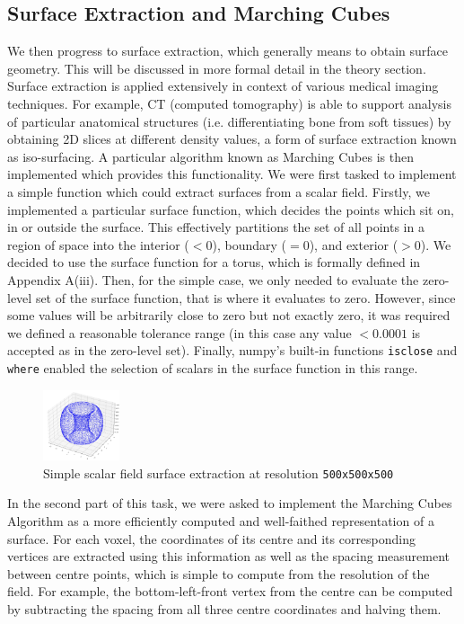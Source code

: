 \documentclass[10pt,a4paper]{article}
\begin{document}
\subsection{Surface Extraction and Marching Cubes}

We then progress to surface extraction, which generally means to obtain surface geometry. This will be discussed in more formal detail in the theory section. Surface extraction is applied extensively in context of various medical imaging techniques. For example, CT (computed tomography) is able to support analysis of particular anatomical structures (i.e. differentiating bone from soft tissues) by obtaining 2D slices at different density values, a form of surface extraction known as iso-surfacing.  A particular algorithm known as Marching Cubes is then implemented which provides this functionality.  We were first tasked to implement a simple function which could extract surfaces from a scalar field. Firstly, we implemented a particular surface function, which decides the points which sit on, in or outside the surface. This effectively partitions the set of all points in a region of space into the interior ($<0$), boundary ($=0$), and exterior ($>0$). We decided to use the surface function for a torus, which is formally defined in Appendix A(iii). Then, for the simple case, we only needed to evaluate the zero-level set of the surface function, that is where it evaluates to zero. However, since some values will be arbitrarily close to zero but not exactly zero, it was required we defined a reasonable tolerance range (in this case any value $<0.0001$ is accepted as in the zero-level set). Finally, numpy’s built-in functions \texttt{isclose} and \texttt{where} enabled the selection of scalars in the surface function in this range.

\begin{figure}[H]
\centering
\includegraphics[width=0.20\textwidth]{VisualComputingReportResults/SimpleSurfaceExtraction}
\caption{Simple scalar field surface extraction at resolution \texttt{500x500x500}}
\label{fig:your_label}
\end{figure}

In the second part of this task, we were asked to implement the Marching Cubes Algorithm as a more efficiently computed and well-faithed representation of a surface. For each voxel, the coordinates of its centre and its corresponding vertices are extracted using this information as well as the spacing measurement between centre points, which is simple to compute from the resolution of the field. For example, the bottom-left-front vertex from the centre can be computed by subtracting the spacing from all three centre coordinates and halving them.
\end{document}
